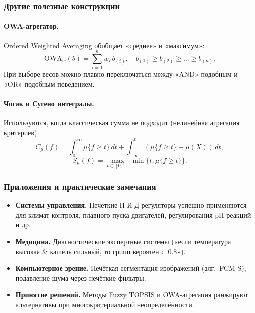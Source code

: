 \subsubsection{Другие полезные конструкции}

\paragraph{OWA-агрегатор.}
Ordered Weighted Averaging
обобщает «среднее» и «максимум»:
\[
  \mathrm{OWA}_w(b)
  = \sum_{i=1}^n w_i\,b_{(i)},
  \quad
  b_{(1)}\ge b_{(2)}\ge\dots\ge b_{(n)}.
\]
При выборе весов можно плавно
переключаться между «AND»-подобным и «OR»-подобным поведением.

\paragraph{Чогак и Сугено интегралы.}
Используются, когда классическая сумма
не подходит (нелинейная агрегация критериев).
\[
  C_\mu(f) = \int_0^\infty \!\!\mu\{f\ge t\}\,dt
           + \int_{-\infty}^0 (\mu\{f\ge t\}-\mu(X))\,dt,
\]
\[
  S_\mu(f) = \max_{t\in[0,1]}\min\bigl\{t,\mu\{f\ge t\}\bigr\}.
\]

\subsubsection{Приложения и практические замечания}

\begin{itemize}
  \item \textbf{Системы управления.}
        Нечёткие П-И-Д регуляторы
        успешно применяются для климат-контроля,
        плавного пуска двигателей,
        регулирования pH-реакций и др.
  \item \textbf{Медицина.}
        Диагностические экспертные системы
        («если температура высокая \& кашель сильный, то грипп
        вероятен с~$0.8$»).
  \item \textbf{Компьютерное зрение.}
        Нечёткая сегментация изображений
        (алг.~FCM-S), подавление шума
        через нечёткие фильтры.
  \item \textbf{Принятие решений.}
        Методы Fuzzy TOPSIS и OWA-агрегация
        ранжируют альтернативы
        при многокритериальной неопределённости.
\end{itemize}

